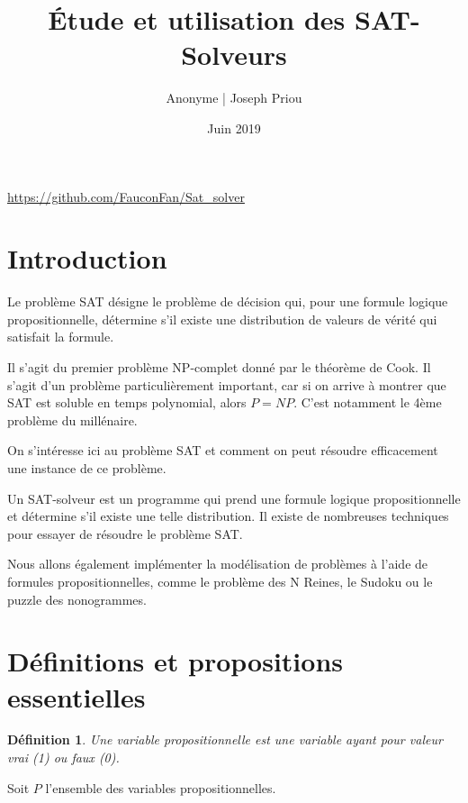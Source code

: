 \documentclass[12pt]{extarticle}
\title{Étude et utilisation des SAT-Solveurs}
\author{Anonyme | Joseph Priou}
\date{Juin 2019}
\newtheorem{mydef}{Définition}
\begin{document}
\maketitle

\begin{center}
\href{https://github.com/FauconFan/Sat_solver}{https://github.com/FauconFan/Sat\_solver} 
\end{center}

\vspace{2cm}

\section*{Introduction}

Le problème SAT désigne le problème de décision qui, pour une formule logique propositionnelle, détermine s'il existe une distribution de valeurs de vérité qui satisfait la formule.

Il s'agit du premier problème NP-complet donné par le théorème de Cook. Il s'agit d'un problème particulièrement important, car si on arrive à montrer que SAT est soluble en temps polynomial, alors $P = NP$. C'est notamment le 4ème problème du millénaire.

On s'intéresse ici au problème SAT et comment on peut résoudre efficacement une instance de ce problème.

Un SAT-solveur est un programme qui prend une formule logique propositionnelle et détermine s'il existe une telle distribution. Il existe de nombreuses techniques pour essayer de résoudre le problème SAT.

Nous allons également implémenter la modélisation de problèmes à l'aide de formules propositionnelles, comme le problème des N Reines, le Sudoku ou le puzzle des nonogrammes.

\newpage

\tableofcontents

\newpage

\section{Définitions et propositions essentielles}

\begin{mydef}
Une variable propositionnelle est une variable ayant pour valeur vrai (1) ou faux (0).
\end{mydef}

Soit $P$ l'ensemble des variables propositionnelles.
\end{document}
